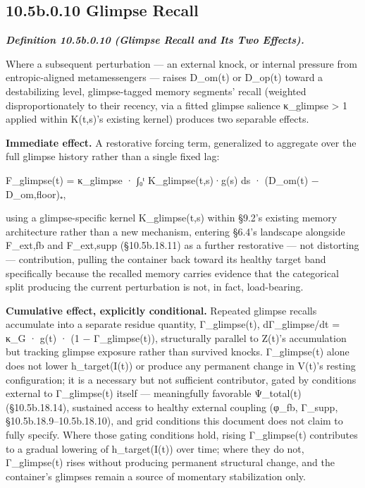 \documentclass[
]{article}
\begin{document}
\hypertarget{b.0.10-glimpse-recall}{%
\subsection{10.5b.0.10 Glimpse Recall}\label{b.0.10-glimpse-recall}}

\emph{\textbf{Definition 10.5b.0.10 (Glimpse Recall and Its Two
Effects).}}

Where a subsequent perturbation --- an external knock, or internal
pressure from entropic-aligned metamessengers --- raises D\_om(t) or
D\_op(t) toward a destabilizing level, glimpse-tagged memory segments'
recall (weighted disproportionately to their recency, via a fitted
glimpse salience κ\_glimpse \textgreater{} 1 applied within K(t,s)'s
existing kernel) produces two separable effects.

\textbf{Immediate effect.} A restorative forcing term, generalized to
aggregate over the full glimpse history rather than a single fixed lag:

F\_glimpse(t) = κ\_glimpse · ∫₀ᵗ K\_glimpse(t,s)·g(s) ds · (D\_om(t) −
D\_om,floor)₊,

using a glimpse-specific kernel K\_glimpse(t,s) within §9.2's existing
memory architecture rather than a new mechanism, entering §6.4's
landscape alongside F\_ext,fb and F\_ext,supp (§10.5b.18.11) as a
further restorative --- not distorting --- contribution, pulling the
container back toward its healthy target band specifically because the
recalled memory carries evidence that the categorical split producing
the current perturbation is not, in fact, load-bearing.

\textbf{Cumulative effect, explicitly conditional.} Repeated glimpse
recalls accumulate into a separate residue quantity, Γ\_glimpse(t),
dΓ\_glimpse/dt = κ\_G · g(t) · (1 − Γ\_glimpse(t)), structurally
parallel to Z(t)'s accumulation but tracking glimpse exposure rather
than survived knocks. Γ\_glimpse(t) alone does not lower h\_target(I(t))
or produce any permanent change in V(t)'s resting configuration; it is a
necessary but not sufficient contributor, gated by conditions external
to Γ\_glimpse(t) itself --- meaningfully favorable Ψ\_total(t)
(§10.5b.18.14), sustained access to healthy external coupling (φ\_fb,
Γ\_supp, §10.5b.18.9--10.5b.18.10), and grid conditions this document
does not claim to fully specify. Where those gating conditions hold,
rising Γ\_glimpse(t) contributes to a gradual lowering of
h\_target(I(t)) over time; where they do not, Γ\_glimpse(t) rises
without producing permanent structural change, and the container's
glimpses remain a source of momentary stabilization only.
\end{document}
